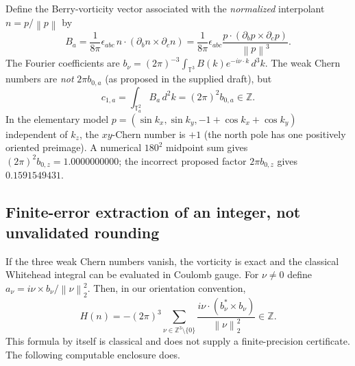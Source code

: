 \documentclass[aps,prd,onecolumn,notitlepage,11pt,superscriptaddress,longbibliography]{revtex4-2}
\newcommand{\norm}[1]{\left\lVert#1\right\rVert}
\begin{document}
Define the Berry-vorticity vector associated with the \emph{normalized} interpolant $n=p/\norm p$ by
\begin{equation}\label{eq:v6B}
B_a=\frac{1}{8\pi}\epsilon_{abc}\,n\cdot(\partial_b n\times\partial_c n)=\frac{1}{8\pi}\epsilon_{abc}\frac{p\cdot(\partial_b p\times\partial_c p)}{\norm p^3}.
\end{equation}
The Fourier coefficients are $b_\nu=(2\pi)^{-3}\int_{\mathbb T^3}B(k)e^{-i\nu\cdot k}\,d^3k$. The weak Chern numbers are \emph{not} $2\pi b_{0,a}$ (as proposed in the supplied draft), but
\begin{equation}\label{eq:v6chern}
\boxed{c_{1,a}=\int_{\mathbb T^2_a}B_a\,d^2k=(2\pi)^2b_{0,a}\in\mathbb Z.}
\end{equation}
In the elementary model $p=(\sin k_x,\sin k_y,-1+\cos k_x+\cos k_y)$ independent of $k_z$, the $xy$-Chern number is $+1$ (the north pole has one positively oriented preimage). A numerical $180^2$ midpoint sum gives $(2\pi)^2b_{0,z}=1.0000000000$; the incorrect proposed factor $2\pi b_{0,z}$ gives $0.1591549431$.

\subsection{Finite-error extraction of an integer, not unvalidated rounding}\label{subsec:v6helicity}

If the three weak Chern numbers vanish, the vorticity is exact and the classical Whitehead integral can be evaluated in Coulomb gauge. For $\nu\neq0$ define $a_\nu=i\nu\times b_\nu/\norm\nu_2^2$. Then, in our orientation convention,
\begin{equation}\label{eq:v6helicity}
\boxed{H(n)=-(2\pi)^3\sum_{\nu\in\mathbb Z^3\setminus\{0\}}\frac{i\nu\cdot(b_\nu^*\times b_\nu)}{\norm\nu_2^2}\in\mathbb Z.}
\end{equation}
This formula by itself is classical and does not supply a finite-precision certificate. The following computable enclosure does.
\end{document}
